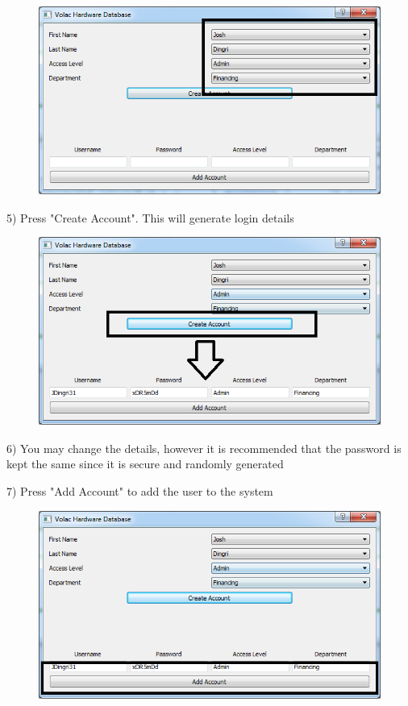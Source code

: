 \begin{figure}[H]
    \includegraphics[width=\textwidth]{./Manual/Images/account2.png}
\end{figure}

5) Press "Create Account". This will generate login details

\begin{figure}[H]
    \includegraphics[width=\textwidth]{./Manual/Images/account3.png}
\end{figure}

6) You may change the details, however it is recommended that the password is kept the same since it is secure and randomly generated

7) Press "Add Account" to add the user to the system

\begin{figure}[H]
    \includegraphics[width=\textwidth]{./Manual/Images/account4.png}
\end{figure}

